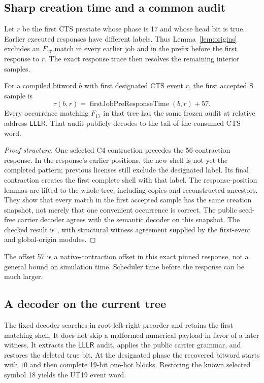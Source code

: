\subsection{Sharp creation time and a common audit}
Let $r$ be the first CTS prestate whose phase is 17 and whose head bit is true.
Earlier executed responses have different labels. Thus Lemma~\ref{lem:origins}
excludes an $F_{17}$ match in every earlier job and in the prefix before the
first response to $r$. The exact response trace then resolves the remaining
interior samples.

\begin{lemma}\label{lem:first}
For a compiled bitword $b$ with first designated CTS event $r$, the first
accepted S sample is
\[
 \tau(b,r)=\operatorname{firstJobPreResponseTime}(b,r)+57.
\]
Every occurrence matching $F_{17}$ in that tree has the same frozen audit at
relative address $\mathsf{LLLR}$. That audit publicly decodes to the tail of
the consumed CTS word.
\end{lemma}

\begin{proof}[Proof structure]
One selected C4 contraction precedes the 56-contraction response. In the
response's earlier positions, the new shell is not yet the completed pattern;
previous licenses still exclude the designated label. Its final contraction
creates the first complete shell with that label. The response-position
lemmas are lifted to the whole tree, including copies and reconstructed
ancestors. They show that every match in the first accepted sample has the
same creation snapshot, not merely that one convenient occurrence is correct.
The public seed-free carrier decoder agrees with the semantic decoder on this
snapshot. The checked result is
, with structural
witness agreement supplied by the first-event and global-origin modules.
\end{proof}

The offset 57 is a native-contraction offset in this exact pinned response,
not a general bound on simulation time. Scheduler time before the response
can be much larger.

\subsection{A decoder on the current tree}
The fixed decoder searches in root-left-right preorder and retains the first
matching shell. It does not skip a malformed numerical payload in favor of a
later witness. It extracts the $\mathsf{LLLR}$ audit, applies the public carrier
grammar, and restores the deleted true bit. At the designated phase the recovered
bitword starts with $10$ and then complete 19-bit one-hot blocks. Restoring the
known selected symbol 18 yields the UT19 event word.

